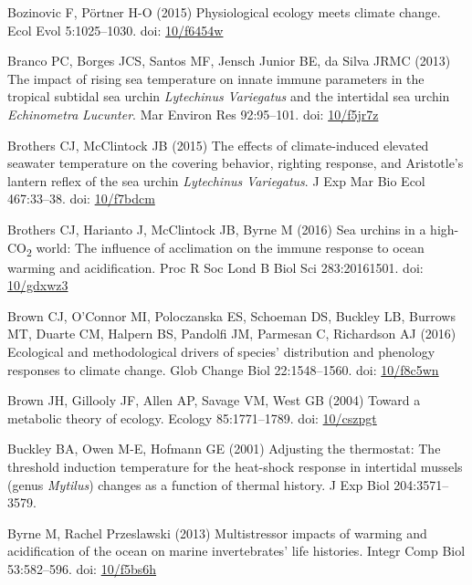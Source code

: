 \documentclass[a4paper,10pt, oneside]{memoir}
\begin{document}
\leavevmode\hypertarget{ref-Bozinovic2015}{}%
Bozinovic F, Pörtner H-O (2015) Physiological ecology meets climate change. Ecol Evol 5:1025--1030. doi: \href{https://doi.org/10/f6454w}{10/f6454w}

\leavevmode\hypertarget{ref-Branco2013}{}%
Branco PC, Borges JCS, Santos MF, Jensch Junior BE, da Silva JRMC (2013) The impact of rising sea temperature on innate immune parameters in the tropical subtidal sea urchin \emph{Lytechinus} \emph{Variegatus} and the intertidal sea urchin \emph{Echinometra} \emph{Lucunter}. Mar Environ Res 92:95--101. doi: \href{https://doi.org/10/f5jr7z}{10/f5jr7z}

\leavevmode\hypertarget{ref-Brothers2015}{}%
Brothers CJ, McClintock JB (2015) The effects of climate-induced elevated seawater temperature on the covering behavior, righting response, and Aristotle's lantern reflex of the sea urchin \emph{Lytechinus} \emph{Variegatus}. J Exp Mar Bio Ecol 467:33--38. doi: \href{https://doi.org/10/f7bdcm}{10/f7bdcm}

\leavevmode\hypertarget{ref-Brothers2016}{}%
Brothers CJ, Harianto J, McClintock JB, Byrne M (2016) Sea urchins in a high-CO\textsubscript{2} world: The influence of acclimation on the immune response to ocean warming and acidification. Proc R Soc Lond B Biol Sci 283:20161501. doi: \href{https://doi.org/10/gdxwz3}{10/gdxwz3}

\leavevmode\hypertarget{ref-Brown2016}{}%
Brown CJ, O'Connor MI, Poloczanska ES, Schoeman DS, Buckley LB, Burrows MT, Duarte CM, Halpern BS, Pandolfi JM, Parmesan C, Richardson AJ (2016) Ecological and methodological drivers of species' distribution and phenology responses to climate change. Glob Change Biol 22:1548--1560. doi: \href{https://doi.org/10/f8c5wn}{10/f8c5wn}

\leavevmode\hypertarget{ref-Brown2004}{}%
Brown JH, Gillooly JF, Allen AP, Savage VM, West GB (2004) Toward a metabolic theory of ecology. Ecology 85:1771--1789. doi: \href{https://doi.org/10/cszpgt}{10/cszpgt}

\leavevmode\hypertarget{ref-Buckley2001}{}%
Buckley BA, Owen M-E, Hofmann GE (2001) Adjusting the thermostat: The threshold induction temperature for the heat-shock response in intertidal mussels (genus \emph{Mytilus}) changes as a function of thermal history. J Exp Biol 204:3571--3579.

\leavevmode\hypertarget{ref-Byrne2013a}{}%
Byrne M, Rachel Przeslawski (2013) Multistressor impacts of warming and acidification of the ocean on marine invertebrates' life histories. Integr Comp Biol 53:582--596. doi: \href{https://doi.org/10/f5bs6h}{10/f5bs6h}
\end{document}
